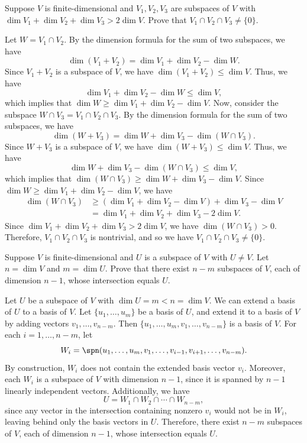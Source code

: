 \begin{exercise}
Suppose $V$ is finite-dimensional and $V_1,V_2,V_3$ are subspaces of $V$ with
$\dim V_1+\dim V_2+\dim V_3>2\dim V$. Prove that $V_1\cap V_2\cap V_3\ne\{0\}$.
\end{exercise}
\begin{solution}
Let $W=V_1\cap V_2$. By the dimension formula for the sum of two subspaces, we
have
\[ \dim(V_1+V_2) = \dim V_1+\dim V_2-\dim W. \]
Since $V_1+V_2$ is a subspace of $V$, we have $\dim(V_1+V_2)\le\dim V$. Thus, we
have
\[ \dim V_1+\dim V_2-\dim W \le \dim V, \]
which implies that $\dim W\ge\dim V_1+\dim V_2-\dim V$. Now, consider the
subspace $W\cap V_3=V_1\cap V_2\cap V_3$. By the dimension formula for the sum
of two subspaces, we have
\[ \dim(W+V_3) = \dim W+\dim V_3-\dim(W\cap V_3). \]
Since $W+V_3$ is a subspace of $V$, we have $\dim(W+V_3)\le\dim V$. Thus, we
have
\[ \dim W+\dim V_3-\dim(W\cap V_3) \le \dim V, \]
which implies that $\dim(W\cap V_3)\ge\dim W+\dim V_3-\dim V$. Since
$\dim W\ge\dim V_1+\dim V_2-\dim V$, we have
\begin{align*}
\dim(W\cap V_3) &\ge (\dim V_1+\dim V_2-\dim V)+\dim V_3-\dim V\\
  &= \dim V_1+\dim V_2+\dim V_3-2\dim V.
\end{align*}
Since $\dim V_1+\dim V_2+\dim V_3>2\dim V$, we have $\dim(W\cap V_3)>0$.
Therefore, $V_1\cap V_2\cap V_3$ is nontrivial, and so we have
$V_1\cap V_2\cap V_3\ne\{0\}$.
\end{solution}

\begin{exercise}
Suppose $V$ is finite-dimensional and $U$ is a subspace of $V$ with $U\ne V$.
Let $n=\dim V$ and $m=\dim U$. Prove that there exist $n-m$ subspaces of $V$,
each of dimension $n-1$, whose intersection equals $U$.
\end{exercise}
\begin{solution}
Let $U$ be a subspace of $V$ with $\dim U=m<n=\dim V$. We can extend a basis of
$U$ to a basis of $V$. Let $\{u_1,\dots,u_m\}$ be a basis of $U$, and extend it
to a basis of $V$ by adding vectors $v_1,\dots,v_{n-m}$. Then
$\{u_1,\dots,u_m,v_1,\dots,v_{n-m}\}$ is a basis of $V$. For each
$i=1,\dots,n-m$, let
\[ W_i = \spn(u_1,\dots,u_m,v_1,\dots,v_{i-1},v_{i+1},\dots,v_{n-m}). \]
By construction, $W_i$ does not contain the extended basis vector $v_i$.
Moreover, each $W_i$ is a subspace of $V$ with dimension $n-1$, since it is
spanned by $n-1$ linearly independent vectors. Additionally, we have
\[ U = W_1\cap W_2\cap\cdots\cap W_{n-m}, \]
since any vector in the intersection containing nonzero $v_i$ would not be in
$W_i$, leaving behind only the basis vectors in $U$. Therefore, there exist
$n-m$ subspaces of $V$, each of dimension $n-1$, whose intersection equals $U$.
\end{solution}


